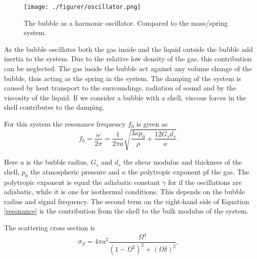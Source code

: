 \begin{figure}[h]
  \centering
  \label{Fig:oscillator}
  \texttt{[image: ./figurer/oscillator.png]}
  \caption{The bubble as a harmonic oscillator. Compared to the mass/spring system\cite{Hoff2000}.}
\end{figure} 

As the bubble oscillates both the gas inside and the liquid outside the bubble add inertia to the system. Due to the relative low density of the gas, this contribution can be neglected. The gas inside the bubble act against any volume change of the bubble, thus acting as the spring in the system. The damping of the system is caused by heat transport to the surroundings, radiation of sound and by the viscosity of the liquid. If we consider a bubble with a shell, viscous forces in the shell contributes to the damping. 

%
%

For this system the resonance frequency $f_0$ is given as \cite{Hoff2000}
\begin{equation}
\label{resonance}
f_0 = \frac{\omega}{2 \pi}= \frac{1}{2 \pi a} \sqrt{\frac{3\kappa p_0}{\rho}+ \frac{12 G_s d_s}{a}}.
\end{equation} 

Here $a$ is the bubble radius, $G_s$ and $d_s$ the shear modulus and thickness of the shell, $p_0$ the atmospheric pressure and $\kappa$ the polytropic exponent pf the gas. The polytropic exponent is equal the adiabatic constant $\gamma$ for if the oscillations are adiabatic, while it is one for isothermal conditions. This depends on the bubble radius and signal frequency\cite{Hoff2000}. The second term on the right-hand side of Equation \eqref{resonance} is the contribution from the shell to the bulk modulus of the system. 

The scattering cross section is 
\begin{equation}
\label{eq:cross section}
\sigma_S = 4\pi a^2 \frac{\Omega^4}{(1-\Omega^2)^2 + (\Omega \delta)^2}, 
\end{equation}

